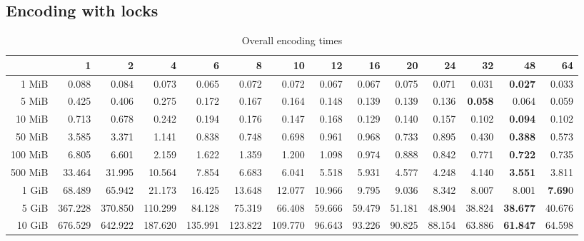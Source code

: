 \subsection{Encoding with locks}
\begin{table}[!h]
	\centering
	\caption{Overall encoding times}
	\begin{tabular}{rrrrrrrrrrrrrr}
		\toprule
		\diagbox[width=7em]{Size}{Threads} & 1  &      2  &      4  &      6  &      8  &      10 &     12 &     16 &     20 &     24 &     32 &     48 &     64 \\
		\midrule
		1 MiB   &   0.088 &   0.084 &   0.073 &   0.065 &   0.072 &   0.072 &  0.067 &  0.067 &  0.075 &  0.071 &  0.031 &  \textbf{0.027} &  0.033 \\
		5 MiB   &   0.425 &   0.406 &   0.275 &   0.172 &   0.167 &   0.164 &  0.148 &  0.139 &  0.139 &  0.136 &  \textbf{0.058} &  0.064 &  0.059 \\
		10 MiB  &   0.713 &   0.678 &   0.242 &   0.194 &   0.176 &   0.147 &  0.168 &  0.129 &  0.140 &  0.157 &  0.102 &  \textbf{0.094} &  0.102 \\
		50 MiB  &   3.585 &   3.371 &   1.141 &   0.838 &   0.748 &   0.698 &  0.961 &  0.968 &  0.733 &  0.895 &  0.430 &  \textbf{0.388} &  0.573 \\
		100 MiB &   6.805 &   6.601 &   2.159 &   1.622 &   1.359 &   1.200 &  1.098 &  0.974 &  0.888 &  0.842 &  0.771 &  \textbf{0.722} &  0.735 \\
		500 MiB &  33.464 &  31.995 &  10.564 &   7.854 &   6.683 &   6.041 &  5.518 &  5.931 &  4.577 &  4.248 &  4.140 &  \textbf{3.551} &  3.811 \\
		1 GiB   &  68.489 &  65.942 &  21.173 &  16.425 &  13.648 &  12.077 & 10.966 &  9.795 &  9.036 &  8.342 &  8.007 &  8.001 &  \textbf{7.69}0 \\
		5 GiB   & 367.228 & 370.850 & 110.299 &  84.128 &  75.319 &  66.408 & 59.666 & 59.479 & 51.181 & 48.904 & 38.824 & \textbf{38.677} & 40.676 \\
		10 GiB  & 676.529 & 642.922 & 187.620 & 135.991 & 123.822 & 109.770 & 96.643 & 93.226 & 90.825 & 88.154 & 63.886 & \textbf{61.847} & 64.598 \\
		\bottomrule
	\end{tabular}
	
\end{table}
